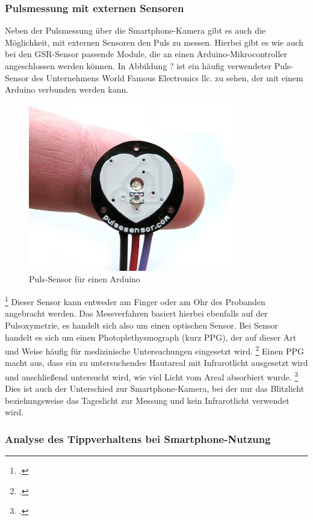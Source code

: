 {\subsubsection{Pulsmessung mit externen Sensoren}
Neben der Pulsmessung über die Smartphone-Kamera gibt es auch die Möglichkeit, mit externen Sensoren den Puls zu messen. Hierbei gibt es wie auch bei den GSR-Sensor passende Module, die an einen Arduino-Mikrocontroller angeschlossen werden können. \newline
In Abbildung ? ist ein häufig verwendeter Puls-Sensor des Unternehmens World Famous Electronics llc. zu sehen, der mit einem Arduino verbunden werden kann. \newline
\begin{figure}[h]
	\centering
	\includegraphics[width=9cm]{Bilder/pulsesensor.jpg}
	\caption[Puls-Sensor für einen Arduino]{Puls-Sensor für einen Arduino\footnotemark}
\end{figure}\footcitetext{Wor18a} \newline
Dieser Sensor kann entweder am Finger oder am Ohr des Probanden angebracht werden. Das Messverfahren basiert hierbei ebenfalls auf der Pulsoxymetrie, es handelt sich also um einen optischen Sensor. Bei Sensor handelt es sich um einen Photoplethysmograph (kurz PPG), der auf dieser Art und Weise häufig für medizinische Untersuchungen eingesetzt wird. \footcite[Vgl. ][]{Wor18b}
Einen PPG macht aus, dass ein zu untersuchendes Hautareal mit Infrarotlicht ausgesetzt wird und anschließend untersucht wird, wie viel Licht vom Areal absorbiert wurde. \footcite[Vgl. ][S. 38]{Rab06}
Dies ist auch der Unterschied zur Smartphone-Kamera, bei der nur das Blitzlicht beziehungsweise das Tageslicht zur Messung und kein Infrarotlicht verwendet wird.

\subsubsection{Analyse des Tippverhaltens bei Smartphone-Nutzung}
}
